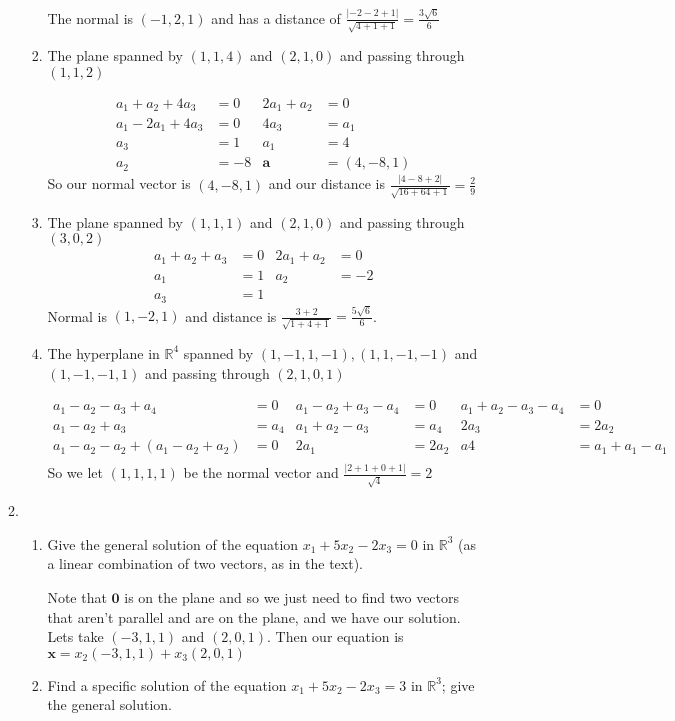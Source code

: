 \documentclass[letterpaper]{article}
\begin{document}
\begin{enumerate}
\begin{enumerate}
\begin{enumerate}
      The normal is $(-1,2,1)$ and has a distance of $\frac{|-2-2+1|}{\sqrt{4+1+1}}=\frac{3\sqrt{6}}{6}$
    \item
      The plane spanned by $(1,1,4)$ and $(2,1,0)$ and passing through $(1,1,2)$

      \begin{align*}
        a_1+a_2+4a_3&=0&
        2a_1+a_2&=0\\
        a_1-2a_1+4a_3&=0&
        4a_3&=a_1\\
        a_3&=1&
        a_1&=4\\
        a_2&=-8&
        \mathbf{a}&=(4,-8,1)
      \end{align*}
      So our normal vector is $(4,-8,1)$ and our distance is $\frac{|4-8+2|}{\sqrt{16+64+1}}=\frac{2}{9}$
    \item
      The plane spanned by $(1,1,1)$ and $(2,1,0)$ and passing through $(3,0,2)$
      \begin{align*}
        a_1+a_2+a_3&=0&
        2a_1+a_2&=0\\
        a_1&=1&
        a_2&=-2\\
        a_3&=1
      \end{align*}
      Normal is $(1,-2,1)$ and distance is $\frac{3+2}{\sqrt{1+4+1}}=\frac{5\sqrt{6}}{6}$.
    \item
      The hyperplane in $\mathbb{R}^4$ spanned by $(1,-1,1,-1),(1,1,-1,-1)$ and $(1,-1,-1,1)$ and passing through $(2,1,0,1)$

      \begin{align*}
        a_1-a_2-a_3+a_4&=0&
        a_1-a_2+a_3-a_4&=0&
        a_1+a_2-a_3-a_4&=0\\
        a_1-a_2+a_3&=a_4&
        a_1+a_2-a_3&=a_4&
        2a_3&=2a_2\\
        a_1-a_2-a_2+(a_1-a_2+a_2)&=0&
        2a_1&=2a_2&
        a4&=a_1+a_1-a_1\\
      \end{align*}
      So we let $(1,1,1,1)$ be the normal vector and $\frac{|2+1+0+1|}{\sqrt{4}}=2$
    \end{enumerate}
  \setcounter{enumii}{5}
  \item
    \begin{enumerate}
    \item
      Give the general solution of the equation $x_1+5x_2-2x_3=0$ in $\mathbb{R}^3$ (as a linear combination of two vectors, as in the text).

      Note that $\mathbf{0}$ is on the plane and so we just need to find two vectors that aren't parallel and are on the plane, and we have our solution. Lets take $(-3,1,1)$ and $(2,0,1)$. Then our equation is $\mathbf{x}=x_2(-3,1,1)+x_3(2,0,1)$
    \item
      Find a specific solution of the equation $x_1+5x_2-2x_3=3$ in $\mathbb{R}^3$; give the general solution.


\end{enumerate}
\end{enumerate}
\end{enumerate}
\end{document}
